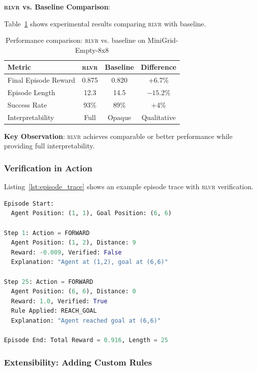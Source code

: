 \documentclass[11pt,a4paper]{article}
\newcommand{\rlvr}{\textsc{rlvr}}
\begin{document}
\textbf{\rlvr{} vs. Baseline Comparison}:

Table~\ref{tab:results} shows experimental results comparing \rlvr{} with baseline.

\begin{table}[t]
\centering
\caption{Performance comparison: \rlvr{} vs. baseline on MiniGrid-Empty-8x8}
\label{tab:results}
\small
\begin{tabular}{@{}lccc@{}}
\toprule
\textbf{Metric} & \textbf{\rlvr{}} & \textbf{Baseline} & \textbf{Difference} \\
\midrule
Final Episode Reward & 0.875 & 0.820 & +6.7\% \\
Episode Length & 12.3 & 14.5 & $-15.2\%$ \\
Success Rate & 93\% & 89\% & +4\% \\
Interpretability & Full & Opaque & Qualitative \\
\bottomrule
\end{tabular}
\end{table}

\textbf{Key Observation}: \rlvr{} achieves comparable or better performance while providing full interpretability.

\subsubsection{Verification in Action}

Listing~\ref{lst:episode_trace} shows an example episode trace with \rlvr{} verification.

\begin{lstlisting}[caption={Example episode trace with verification}, label=lst:episode_trace, language=Python, numbers=none]
Episode Start:
  Agent Position: (1, 1), Goal Position: (6, 6)

Step 1: Action = FORWARD
  Agent Position: (1, 2), Distance: 9
  Reward: -0.009, Verified: False
  Explanation: "Agent at (1,2), goal at (6,6)"

Step 25: Action = FORWARD
  Agent Position: (6, 6), Distance: 0
  Reward: 1.0, Verified: True
  Rule Applied: REACH_GOAL
  Explanation: "Agent reached goal at (6,6)"

Episode End: Total Reward = 0.916, Length = 25
\end{lstlisting}

\subsubsection{Extensibility: Adding Custom Rules}
\end{document}
